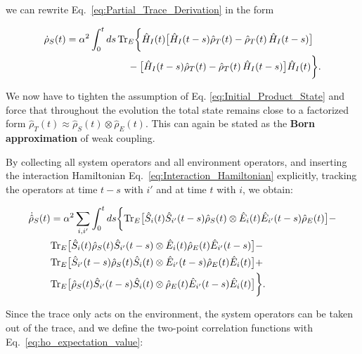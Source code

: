 \noindent
we can rewrite Eq.~\eqref{eq:Partial_Trace_Derivation} in the form

\begin{align}
	\dot{\rho}_S(t) & = \alpha^2 \int_0^t ds \, \mathrm{Tr}_E \bigg\{
	\hat{H}_I(t) \big[ \hat{H}_I(t-s) \hat{\rho}_T(t) - \hat{\rho}_T(t) \, \hat{H}_I(t-s) \big] \notag                                   \\
	                & \qquad\qquad\qquad\; - \big[ \hat{H}_I(t-s) \hat{\rho}_T(t) - \hat{\rho}_T(t) \, \hat{H}_I(t-s) \big] \hat{H}_I(t)
	\bigg\}.
	\label{eq:Second_Order_Final_Expression}
\end{align}

\noindent
We now have to tighten the assumption of Eq. \eqref{eq:Initial_Product_State} and force that throughout the evolution the total state remains close to a factorized form $\hat{\rho}_T(t) \approx \hat{\rho}_S(t) \otimes \hat{\rho}_E(t)$. This can again be stated as the \textbf{Born approximation} of weak coupling.

\noindent
By collecting all system operators and all environment operators, and inserting the interaction Hamiltonian Eq.~\eqref{eq:Interaction_Hamiltonian} explicitly, tracking the operators at time $t - s$ with $i'$ and at time $t$ with $i$, we obtain:

\begin{align}
	\dot{\hat{\rho}}_S(t) & = \alpha^2  \sum_{i, i'} \int_0^t ds
	\bigg\{
	\mathrm{Tr}_E \big[ \hat{S}_i(t) \hat{S}_{i'}(t-s) \hat{\rho}_S(t)      \otimes   \hat{E}_{i}(t) \hat{E}_{i'}(t-s) \hat{\rho}_E(t)  \big] -  \notag                         \\
	                      & \mathrm{Tr}_E \big[ \hat{S}_i(t) \hat{\rho}_S(t) \hat{S}_{i'}(t-s)      \otimes   \hat{E}_{i}(t) \hat{\rho}_E(t) \hat{E}_{i'}(t-s)  \big] - \notag \\
	                      & \mathrm{Tr}_E \big[ \hat{S}_{i'}(t-s) \hat{\rho}_S(t) \hat{S}_i(t)      \otimes   \hat{E}_{i'}(t-s) \hat{\rho}_E(t) \hat{E}_{i}(t)  \big] +  \notag \\
	                      & \mathrm{Tr}_E \big[ \hat{\rho}_S(t) \hat{S}_{i'}(t-s) \hat{S}_i(t)      \otimes   \hat{\rho}_E(t) \hat{E}_{i'}(t-s) \hat{E}_{i}(t)  \big]
	\bigg\}.
	\label{eq:Interaction_Hamiltonian_Expansion}
\end{align}

\noindent
Since the trace only acts on the environment, the system operators can be taken out of the trace, and we define the two-point correlation functions with Eq.~\eqref{eq:ho_expectation_value}:

